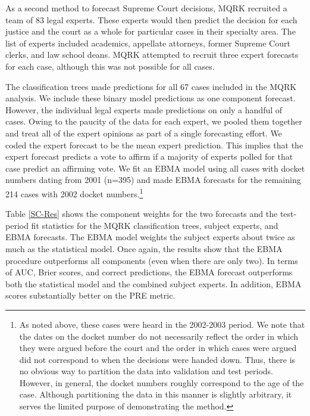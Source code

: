 As a second method to forecast Supreme Court decisions, MQRK recruited
a team of 83 legal experts. These experts would then predict the
decision for each justice and the court as a whole for particular
cases in their specialty area. The list of experts included academics,
appellate attorneys, former Supreme Court clerks, and law school
deans. MQRK attempted to recruit three expert forecasts for each case,
although this was not possible for all cases.

The classification trees made predictions for all 67 cases included in
the MQRK analysis. We include these binary model predictions as one
component forecast. However, the individual legal experts made
predictions on only a handful of cases. Owing to the paucity of the
data for each expert, we pooled them together and treat all of the
expert opinions as part of a single forecasting effort. We coded the
expert forecast to be the mean expert prediction. This implies that
the expert forecast predicts a vote to affirm if a majority of experts
polled for that case predict an affirming vote. We fit an EBMA model
using all cases with docket numbers dating from 2001 (n=395) and made
EBMA forecasts for the remaining 214 cases with 2002 docket
numbers.\footnote{As noted above, these cases were heard in the
  2002-2003 period.  We note that the dates on the docket number do
  not necessarily reflect the order in which they were argued before
  the court and the order in which cases were argued did not correspond
  to when the decisions were handed down.  Thus, there is no obvious
  way to partition the data into validation and test periods.
  However, in general, the docket numbers roughly correspond to the
  age of the case.  Although partitioning the data in this manner is
  slightly arbitrary, it serves the limited purpose of demonstrating
  the method.}

Table \ref{SC-Res} shows the component weights for the two forecasts
and the test-period fit statistics for the MQRK classification trees,
subject experts, and EBMA forecasts. The EBMA model weights the
subject experts about twice as much as the statistical model. Once
again, the results show that the EBMA procedure outperforms all
components (even when there are only two). In terms of AUC, Brier
scores, and correct predictions, the EBMA forecast outperforms both
the statistical model and the combined subject experts. In addition,
EBMA scores substantially better on the PRE metric.
 
